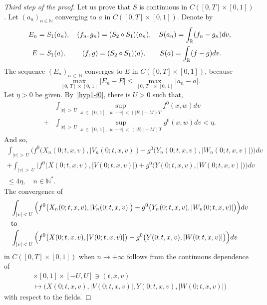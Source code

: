 \documentclass[AHL,Unicode,longabstracts,published]{cedram}
\newcommand{\R}{\mathbb{R}}
\newcommand{\N}{\mathbb{N}}
\begin{document}
\begin{proof}[{Third step of the proof}]
Let us prove that $S$ is continuous in $C([0,T] \times [0,1])$. Let $(a_n)_{n\in \N }$ converging to $a$ in $C([0,T] \times [0,1])$. Denote by
\begin{align*}
E_n &= S_1(a_n), \quad (f_n,g_n) = (S_2 \circ S_1) (a_n), \quad S(a_n) = \int_{\R } (f_n-g_n)dv,\\
E &= S_1(a),\mkern41mu (f,g) = (S_2 \circ S_1)(a), \mkern35mu S(a) = \int_{\R } (f-g)dv.
\end{align*}
The sequence $(E_n)_{n\,\in\,\N}$ converges to $E$ in $C([0,T] \times [0,1])$, because
\[
\max_{[0,\,T]\,\times\,[0,\,1]} \left|E_n-E\right| \leq \max_{[0,\,T]\,\times\,[0,\,1]} \left|a_n-a\right|.
\]
Let $\eta>0$ be given. By~\eqref{hyp1-f0}, there is $U>0$ such that,
\begin{align*}
&\int_{|v|\,>\,U} \sup_{x\,\in\,[0,\,1],\,|w-v|\,<\left(\left|E_0\right|+M\right)T} f^0(x,w)dv \\
+ &\int_{|v|\,>\,U} \sup_{x\,\in\,[0,\,1],\,|w-v|\,<\,\left(\left|E_0\right|+M\right)T} g^0(x,w)dv < \eta.
\end{align*}
And so,
\begin{multline*}
\int_{|v|\,>\,U} \Big(f^0\big(X_n(0;t,x,v),\lvert V_n(0;t,x,v)\rvert\big)+g^0\big(Y_n(0;t,x,v),\lvert W_n(0;t,x,v)\rvert\big)\Big) dv\\
+\int_{|v|\,>\,U} \Big(f^0\big(X(0;t,x,v),\lvert V(0;t,x,v)\rvert\big)+g^0\big(Y(0;t,x,v),\lvert W(0;t,x,v)\rvert\big)\big) dv\\
\leq 4\eta,\quad n\in \N ^*.
\end{multline*}
The convergence of
\begin{align*}
&\int_{|v|\,<\,U} \Big(f^0\big(X_n(0;t,x,v),|V_n(0;t,x,v)|\big)-g^0\big(Y_n(0;t,x,v),|W_n(0;t,x,v)|\big)\Big) dv
\\
\intertext{to}
&\int_{|v|\,<\,U} \Big(f^0\big(X(0;t,x,v),|V(0;t,x,v)|\big)-g^0\big(Y(0;t,x,v),|W(0;t,x,v)|\big)\Big) dv
\end{align*}
in $C([0,T] \times [0,1])$ when $n \to +\infty $ follows from the continuous dependence of
\begin{multline*}
[0,T] \times [0,1] \times [-U,U] \ni (t,x,v)\\ \mapsto \big(X(0;t,x,v),|V(0;t,x,v)|,Y(0;t,x,v),|W(0;t,x,v)|\big)
\end{multline*}
with respect to the fields.
\end{proof}
\end{document}
